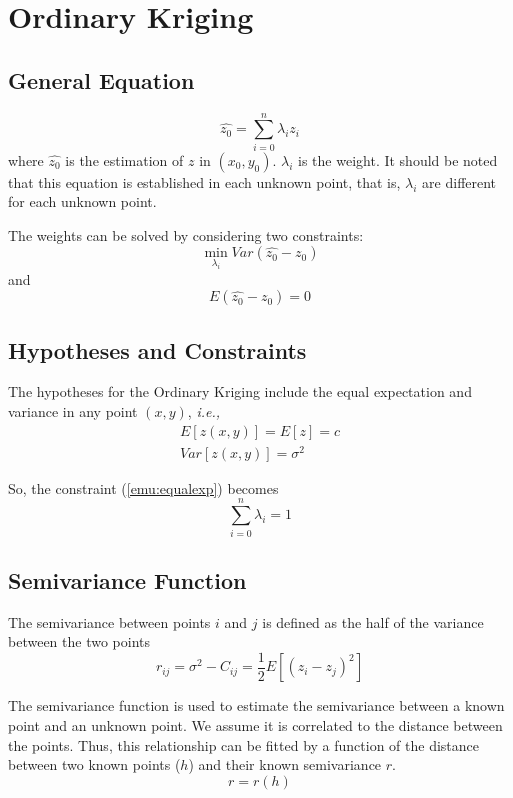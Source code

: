 \documentclass{article}
\begin{document}
\section{Ordinary Kriging}

\subsection{General Equation}
\begin{equation}
\label{emu:ok}
    \hat{z_0}=\sum_{i=0}^{n}\lambda_iz_i
\end{equation}
where $\hat{z_0}$ is the estimation of $z$ in $(x_0, y_0)$. $\lambda_i$ is the weight. It should be noted that this equation is established in each unknown point, that is, $\lambda_i$ are different for each unknown point.

The weights can be solved by considering two constraints:
\begin{equation}
\label{emu:res2}
    \min\limits_{\lambda_i}Var(\hat{z_0}-z_0)
\end{equation}
and 
\begin{equation}
\label{emu:equalexp}
    E(\hat{z_0}-z_0)=0
\end{equation}

\subsection{Hypotheses and Constraints}
The hypotheses for the Ordinary Kriging include the equal expectation and variance in any point $(x,y)$, \textit{i.e.,}
\begin{align}
    E[z(x,y)]=E[z]=c\\
    Var[z(x,y)]=\sigma^2
\end{align}

So, the constraint (\ref{emu:equalexp}) becomes
\begin{equation}
\label{emu:res1}
    \sum_{i=0}^n\lambda_i=1
\end{equation}

\subsection{Semivariance Function}
The semivariance between points $i$ and $j$ is defined as the half of the variance between the two points
\begin{equation}
    r_{ij}=\sigma^2-C_{ij}=\frac{1}{2}E[(z_i-z_j)^2]
\end{equation}

The semivariance function is used to estimate the semivariance between a known point and an unknown point. We assume it is correlated to the distance between the points. Thus, this relationship can be fitted by a function of the distance between two known points ($h$) and their known semivariance $r$. 
\begin{equation}
\label{emu:semi}
    r=r(h)
\end{equation}
\end{document}
